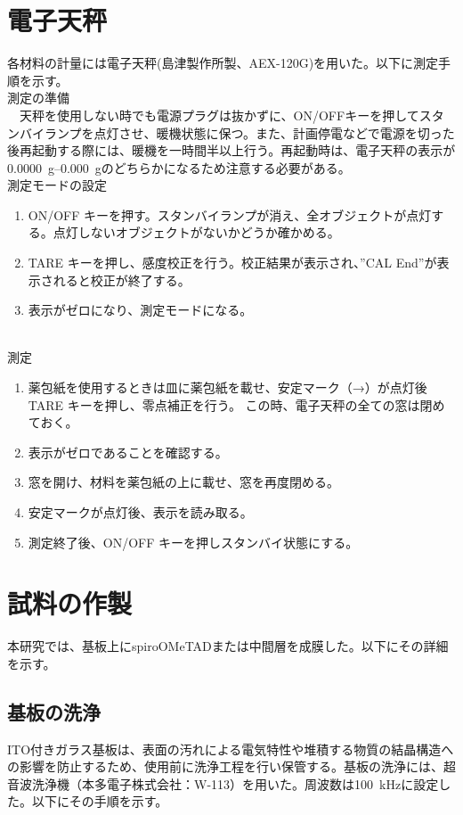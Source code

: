 \section{電子天秤}
各材料の計量には電子天秤(島津製作所製、AEX-120G)を用いた。以下に測定手順を示す。
\\\newline
測定の準備\\
　天秤を使用しない時でも電源プラグは抜かずに、ON/OFFキーを押してスタンバイランプを点灯させ、暖機状態に保つ。また、計画停電などで電源を切った後再起動する際には、暖機を一時間半以上行う。再起動時は、電子天秤の表示が\SIrange[range-phrase = { or }]{0.0000}{0.000}{ \g}のどちらかになるため注意する必要がある。
\\\newline
測定モードの設定
\begin{enumerate}
    \item ON/OFF キーを押す。スタンバイランプが消え、全オブジェクトが点灯する。点灯しないオブジェクトがないかどうか確かめる。
    \item TARE キーを押し、感度校正を行う。校正結果が表示され、''CAL End''が表示されると校正が終了する。
    \item 表示がゼロになり、測定モードになる。
\end{enumerate}
\leavevmode\\
測定
\begin{enumerate}
    \item 薬包紙を使用するときは皿に薬包紙を載せ、安定マーク（→）が点灯後 TARE キーを押し、零点補正を行う。
    この時、電子天秤の全ての窓は閉めておく。
    \item 表示がゼロであることを確認する。
    \item 窓を開け、材料を薬包紙の上に載せ、窓を再度閉める。
    \item 安定マークが点灯後、表示を読み取る。
    \item 測定終了後、ON/OFF キーを押しスタンバイ状態にする。
 \end{enumerate}   
    
\section{試料の作製}
本研究では、基板上にspiroOMeTADまたは中間層を成膜した。以下にその詳細を示す。
\subsection{基板の洗浄}
ITO付きガラス基板は、表面の汚れによる電気特性や堆積する物質の結晶構造への影響を防止するため、使用前に洗浄工程を行い保管する。基板の洗浄には、超音波洗浄機（本多電子株式会社：W-113）を用いた。周波数は\SIlist{100}{\kilo\hertz}に設定した。以下にその手順を示す。

